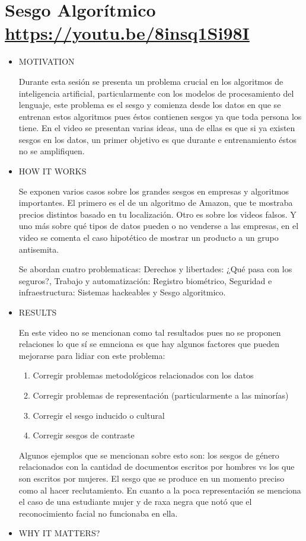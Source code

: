 \documentclass[letter, 11pt, twoside]{report}
\begin{document}
\section*{Sesgo Algorítmico \color{mirosa}\url{https://youtu.be/8insq1Si98I}}
\begin{itemize}
    \item MOTIVATION
    
    Durante esta sesión se presenta un problema crucial en los algoritmos de inteligencia artificial, particularmente con los modelos de procesamiento del lenguaje, este problema es el sesgo y comienza desde los datos en que se entrenan estos algoritmos pues éstos contienen sesgos ya que toda persona los tiene. 
    En el video se presentan varias ideas, una de ellas es que si ya existen sesgos en los datos, un primer objetivo es que durante e entrenamiento éstos no se amplifiquen.
    \item HOW IT WORKS
    
    Se exponen varios casos sobre los grandes sesgos en empresas y algoritmos importantes. El primero es el de un algoritmo de Amazon, que te mostraba precios distintos basado en tu localización. Otro es sobre los videos falsos. Y uno más sobre qué tipos de datos pueden o no venderse a las empresas, en el video se comenta el caso hipotético de mostrar un producto a un grupo antisemita. 

    Se abordan cuatro problematicas: Derechos y libertades: ¿Qué pasa con los seguros?, Trabajo y automatización: Registro biométrico, Seguridad e infraestructura: Sistemas hackeables y Sesgo algoritmico.
    \item RESULTS
    
    En este video no se mencionan como tal resultados pues no se proponen relaciones lo que sí se emnciona es que hay algunos factores que pueden mejorarse para lidiar con este problema:
    \begin{enumerate}
        \item Corregir problemas metodológicos relacionados con los datos
        \item Corregir problemas de representación (particularmente a las minorías)
        \item Corregir el sesgo inducido o cultural
        \item Corregir sesgos de contraste
    \end{enumerate}
    Algunos ejemplos que se mencionan sobre esto son: los sesgos de género relacionados con la cantidad de documentos escritos por hombres vs los que son escritos por mujeres. El sesgo que se produce en un momento preciso como al hacer reclutamiento. En cuanto a la poca representación se menciona el caso de una estudiante mujer y de raxa negra que notó que el reconocimiento facial no funcionaba en ella.
    \item WHY IT MATTERS?
    


\end{itemize}
\end{document}
